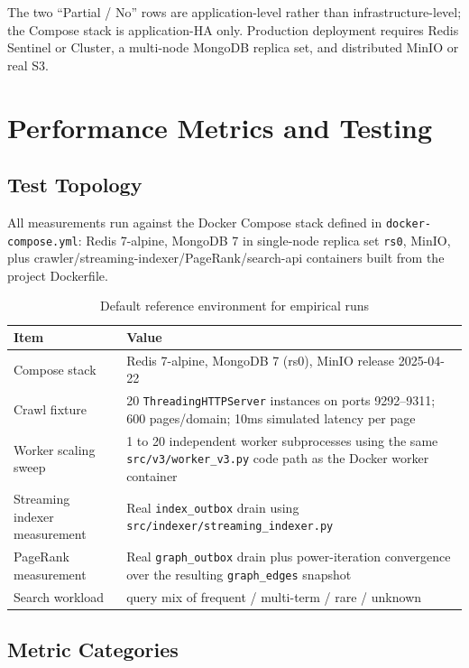 \documentclass[11pt,a4paper]{article}
\newcommand{\code}[1]{\texttt{#1}}
\begin{document}
The two ``Partial / No'' rows are application-level rather than infrastructure-level; the Compose stack is application-HA only. Production deployment requires Redis Sentinel or Cluster, a multi-node MongoDB replica set, and distributed MinIO or real S3.

\section{Performance Metrics and Testing}

\subsection{Test Topology}

All measurements run against the Docker Compose stack defined in \code{docker-compose.yml}: Redis 7-alpine, MongoDB 7 in single-node replica set \code{rs0}, MinIO, plus crawler/streaming-indexer/PageRank/search-api containers built from the project Dockerfile.

\begin{table}[H]
\centering
\caption{Default reference environment for empirical runs}
\begin{tabular}{p{}p{}}
\toprule
Item & Value \\
\midrule
Compose stack & Redis 7-alpine, MongoDB 7 (rs0), MinIO release 2025-04-22\\
Crawl fixture & 20 \code{ThreadingHTTPServer} instances on ports 9292--9311; 600 pages/domain; 10ms simulated latency per page\\
Worker scaling sweep & 1 to 20 independent worker subprocesses using the same \code{src/v3/worker\_v3.py} code path as the Docker worker container\\
Streaming indexer measurement & Real \code{index\_outbox} drain using \code{src/indexer/streaming\_indexer.py}\\
PageRank measurement & Real \code{graph\_outbox} drain plus power-iteration convergence over the resulting \code{graph\_edges} snapshot\\
Search workload & query mix of frequent / multi-term / rare / unknown\\
\bottomrule
\end{tabular}
\end{table}

\subsection{Metric Categories}
\end{document}
